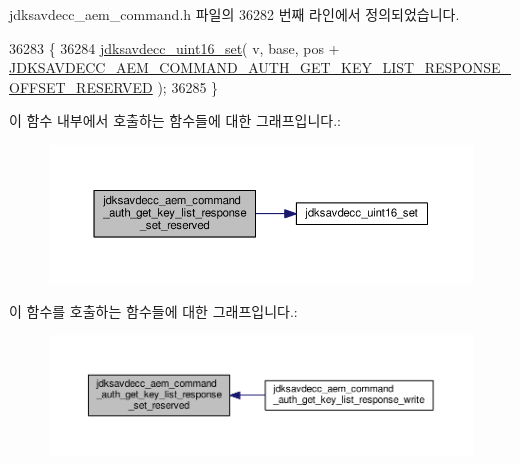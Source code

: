 jdksavdecc\+\_\+aem\+\_\+command.\+h 파일의 36282 번째 라인에서 정의되었습니다.


\begin{DoxyCode}
36283 \{
36284     \hyperlink{group__endian_ga14b9eeadc05f94334096c127c955a60b}{jdksavdecc\_uint16\_set}( v, base, pos + 
      \hyperlink{group__command__auth__get__key__list__response_gac34c30ffeaf37c7057072f996929f1e6}{JDKSAVDECC\_AEM\_COMMAND\_AUTH\_GET\_KEY\_LIST\_RESPONSE\_OFFSET\_RESERVED}
       );
36285 \}
\end{DoxyCode}


이 함수 내부에서 호출하는 함수들에 대한 그래프입니다.\+:
\nopagebreak
\begin{figure}[H]
\begin{center}
\leavevmode
\includegraphics[width=350pt]{group__command__auth__get__key__list__response_ga4c613b358da2310fdadf31fcfae08e45_cgraph}
\end{center}
\end{figure}




이 함수를 호출하는 함수들에 대한 그래프입니다.\+:
\nopagebreak
\begin{figure}[H]
\begin{center}
\leavevmode
\includegraphics[width=350pt]{group__command__auth__get__key__list__response_ga4c613b358da2310fdadf31fcfae08e45_icgraph}
\end{center}
\end{figure}


